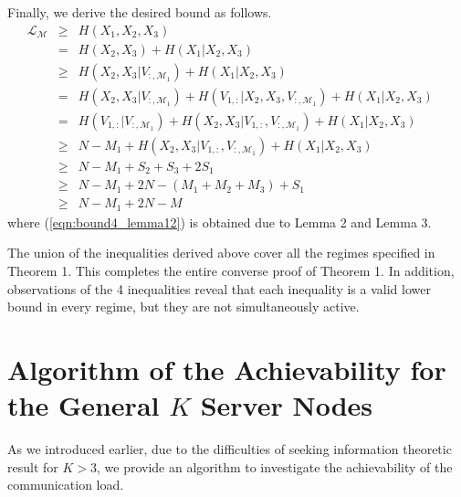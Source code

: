 \documentclass[conference]{IEEEtran}
\begin{document}
Finally, we derive the desired bound as follows.
\begin{eqnarray}
{\mathcal L}_{\mathcal M}&\!\!\!\!\geq\!\!\!\!& H(X_1,X_2,X_3) \\
&\!\!\!\!=\!\!\!\!& H(X_2,X_3)+H(X_1|X_2,X_3)\\
&\!\!\!\!\geq\!\!\!\!& H(X_2,X_3|V_{:,\mathcal{M}_1})+H(X_1|X_2,X_3)\\
&\!\!\!\!=\!\!\!\!& H(X_2,X_3|V_{:,\mathcal{M}_1}\!)\!+\!H(V_{1,:}|X_2,X_3,\!V_{:,\mathcal{M}_1}\!)\!+\!H(X_1|X_2,X_3\!)\ \ \ \ \ \\
&\!\!\!\!=\!\!\!\!& H(V_{1,:}|V_{:,\mathcal{M}_1})\!+\!H(X_2,X_3|V_{1,:},V_{:,\mathcal{M}_1})\!+\!H(X_1|X_2,X_3)\ \ \ \ \\
&\!\!\!\!\geq\!\!\!\!& N-M_1+H(X_2,X_3|V_{1,:},V_{:,\mathcal{M}_1})+H(X_1|X_2,X_3)\\
&\!\!\!\!\geq\!\!\!\!& N-M_1+S_2+S_3+2S_1\label{eqn:bound4_lemma12}\\
&\!\!\!\!\geq\!\!\!\!& N-M_1+2N-(M_1+M_2+M_3)+S_1\\
&\!\!\!\!\geq\!\!\!\!& N-M_1+2N-M
\end{eqnarray}
where (\ref{eqn:bound4_lemma12}) is obtained due to Lemma 2 and Lemma 3.

The union of the inequalities derived above cover all the regimes specified in Theorem 1. This completes the entire converse proof of Theorem 1. In addition, observations of the 4 inequalities reveal that each inequality is a valid lower bound in every regime, but they are not simultaneously active.



\section{Algorithm of the Achievability for the General $K$ Server Nodes}\label{sec:generalK}

As we introduced earlier, due to the difficulties of seeking information theoretic result for $K>3$, we provide an algorithm to investigate the achievability of the communication load.
\end{document}
